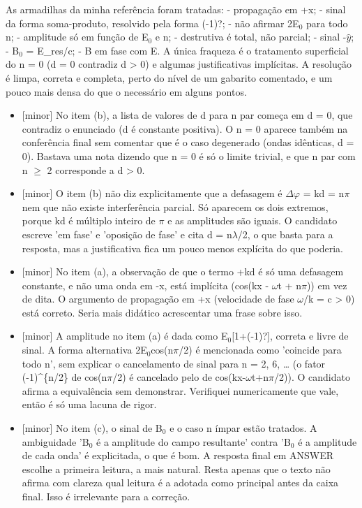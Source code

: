 \documentclass{article}%
\begin{document}
\newline%
As armadilhas da minha referência foram tratadas:\newline%
{-} propagação em +x;\newline%
{-} sinal da forma soma{-}produto, resolvido pela forma (-1)?;\newline%
{-} não afirmar 2E$_{0}$ para todo n;\newline%
{-} amplitude só em função de E$_{0}$ e n;\newline%
{-} destrutiva é total, não parcial;\newline%
{-} sinal -$\hat y$;\newline%
{-} B$_{0}$ = E\_res/c;\newline%
{-} B em fase com E.\newline%
\newline%
A única fraqueza é o tratamento superficial do n = 0 (d = 0 contradiz d > 0) e algumas justificativas implícitas. A resolução é limpa, correta e completa, perto do nível de um gabarito comentado, e um pouco mais densa do que o necessário em alguns pontos.%
\begin{itemize}%
\item%
{[}minor{]} No item (b), a lista de valores de d para n par começa em d = 0, que contradiz o enunciado (d é constante positiva). O n = 0 aparece também na conferência final sem comentar que é o caso degenerado (ondas idênticas, d = 0). Bastava uma nota dizendo que n = 0 é só o limite trivial, e que n par com n $\geq$ 2 corresponde a d > 0.%
\item%
{[}minor{]} O item (b) não diz explicitamente que a defasagem é $\Delta$$\varphi$ = kd = n$\pi$ nem que não existe interferência parcial. Só aparecem os dois extremos, porque kd é múltiplo inteiro de $\pi$ e as amplitudes são iguais. O candidato escreve 'em fase' e 'oposição de fase' e cita d = n$\lambda$/2, o que basta para a resposta, mas a justificativa fica um pouco menos explícita do que poderia.%
\item%
{[}minor{]} No item (a), a observação de que o termo +kd é só uma defasagem constante, e não uma onda em -x, está implícita (cos(kx - $\omega$t + n$\pi$)) em vez de dita. O argumento de propagação em +x (velocidade de fase $\omega$/k = c > 0) está correto. Seria mais didático acrescentar uma frase sobre isso.%
\item%
{[}minor{]} A amplitude no item (a) é dada como E$_{0}${[}1+(-1)?{]}, correta e livre de sinal. A forma alternativa 2E$_{0}$cos(n$\pi$/2) é mencionada como 'coincide para todo n', sem explicar o cancelamento de sinal para n = 2, 6, \ldots{} (o fator (-1)\^{}\{n/2\} de cos(n$\pi$/2) é cancelado pelo de cos(kx-$\omega$t+n$\pi$/2)). O candidato afirma a equivalência sem demonstrar. Verifiquei numericamente que vale, então é só uma lacuna de rigor.%
\item%
{[}minor{]} No item (c), o sinal de B$_{0}$ e o caso n ímpar estão tratados. A ambiguidade 'B$_{0}$ é a amplitude do campo resultante' contra 'B$_{0}$ é a amplitude de cada onda' é explicitada, o que é bom. A resposta final em ANSWER escolhe a primeira leitura, a mais natural. Resta apenas que o texto não afirma com clareza qual leitura é a adotada como principal antes da caixa final. Isso é irrelevante para a correção.%
\end{itemize}%
\end{document}
